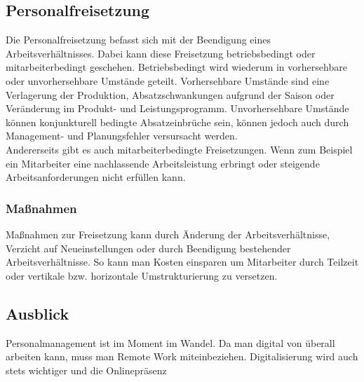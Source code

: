 \documentclass{article}
\begin{document}
	\subsection{Personalfreisetzung}
	Die Personalfreisetzung befasst sich mit der Beendigung eines Arbeitsverhältnisses. Dabei kann diese Freisetzung betriebsbedingt oder mitarbeiterbedingt geschehen. Betriebsbedingt wird wiederum in vorhersehbare oder unvorhersehbare Umstände geteilt. Vorhersehbare Umstände sind eine Verlagerung der Produktion, Absatzschwankungen aufgrund der Saison oder Veränderung im Produkt- und Leistungsprogramm. Unvorhersehbare Umstände können konjunkturell bedingte Absatzeinbrüche sein, können jedoch auch durch Management- und Planungsfehler versursacht werden. \\
	Andererseits gibt es auch mitarbeiterbedingte Freisetzungen. Wenn zum Beispiel ein Mitarbeiter eine nachlassende Arbeitsleistung erbringt oder steigende Arbeitsanforderungen nicht erfüllen kann. 
	\subsubsection{Maßnahmen}
	Maßnahmen zur Freisetzung kann durch Änderung der Arbeitsverhältnisse, Verzicht auf Neueinstellungen oder durch Beendigung bestehender Arbeitsverhältnisse. So kann man Kosten einsparen um Mitarbeiter durch Teilzeit oder vertikale bzw. horizontale Umstrukturierung zu versetzen.
	\subsection{Ausblick}
	Personalmanagement ist im Moment im Wandel. Da man digital von überall arbeiten kann, muss man Remote Work miteinbeziehen. Digitalisierung wird auch stets wichtiger und die Onlinepräsenz






















  
\end{document}
